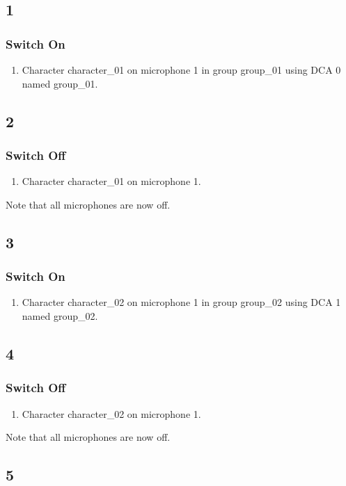 \subsection* {1}
\subsubsection* {Switch On}
\begin{enumerate}
\item Character character\_01 on microphone 1 in group group\_01 using DCA 0 named group\_01.
\end{enumerate}
\subsection* {2}
\subsubsection* {Switch Off}
\begin{enumerate}
\item Character character\_01 on microphone 1.
\end{enumerate}
Note that all microphones are now off.
\subsection* {3}
\subsubsection* {Switch On}
\begin{enumerate}
\item Character character\_02 on microphone 1 in group group\_02 using DCA 1 named group\_02.
\end{enumerate}
\subsection* {4}
\subsubsection* {Switch Off}
\begin{enumerate}
\item Character character\_02 on microphone 1.
\end{enumerate}
Note that all microphones are now off.
\subsection* {5}
